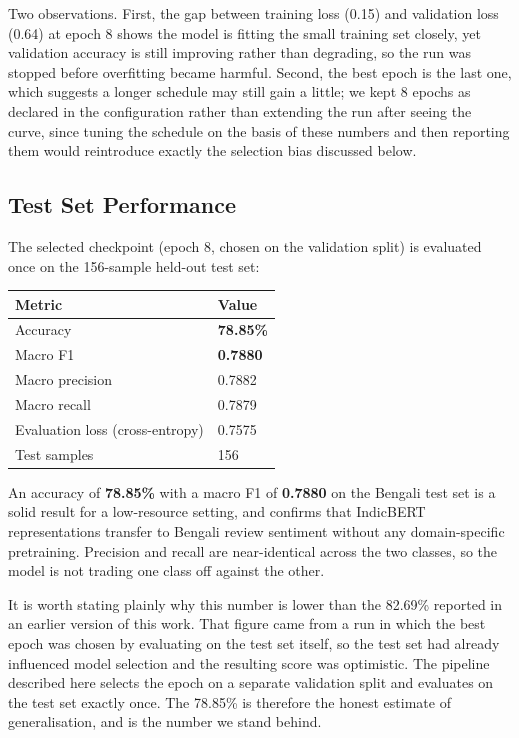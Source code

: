 \documentclass[11pt,a4paper]{article}
\begin{document}
Two observations. First, the gap between training loss (0.15) and validation loss (0.64) at epoch 8 shows the model is fitting the small training set closely, yet validation accuracy is still improving rather than degrading, so the run was stopped before overfitting became harmful. Second, the best epoch is the last one, which suggests a longer schedule may still gain a little; we kept 8 epochs as declared in the configuration rather than extending the run after seeing the curve, since tuning the schedule on the basis of these numbers and then reporting them would reintroduce exactly the selection bias discussed below.

\subsection{Test Set Performance}

The selected checkpoint (epoch 8, chosen on the validation split) is evaluated once on the 156-sample held-out test set:

\begin{center}
\begin{tabular}{ll}
\toprule
\textbf{Metric} & \textbf{Value} \\
\midrule
Accuracy                       & \textbf{78.85\%} \\
Macro F1                       & \textbf{0.7880} \\
Macro precision                & 0.7882 \\
Macro recall                   & 0.7879 \\
Evaluation loss (cross-entropy)& 0.7575 \\
Test samples                   & 156 \\
\bottomrule
\end{tabular}
\end{center}

An accuracy of \textbf{78.85\%} with a macro F1 of \textbf{0.7880} on the Bengali test set is a solid result for a low-resource setting, and confirms that IndicBERT representations transfer to Bengali review sentiment without any domain-specific pretraining. Precision and recall are near-identical across the two classes, so the model is not trading one class off against the other.

It is worth stating plainly why this number is lower than the 82.69\% reported in an earlier version of this work. That figure came from a run in which the best epoch was chosen by evaluating on the test set itself, so the test set had already influenced model selection and the resulting score was optimistic. The pipeline described here selects the epoch on a separate validation split and evaluates on the test set exactly once. The 78.85\% is therefore the honest estimate of generalisation, and is the number we stand behind.
\end{document}
